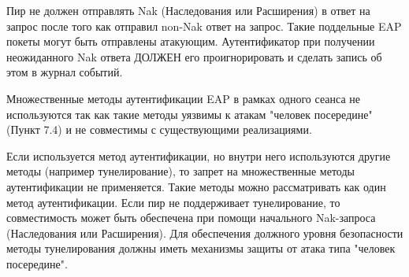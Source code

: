 Пир не должен отправлять Nak (Наследования или Расширения) в ответ на запрос после того как отправил non-Nak ответ на запрос. Такие поддельные EAP покеты могут быть отправлены атакующим. Аутентификатор при получении неожиданного Nak ответа ДОЛЖЕН его проигнорировать и сделать запись об этом в журнал событий.

Множественные методы аутентификации EAP в рамках одного сеанса не используются так как такие методы уязвимы к атакам "человек посередине" (Пункт 7.4) и не совместимы с существующими реализациями.

Если используется метод аутентификации, но внутри него используются другие методы (например тунелирование), то запрет на множественные методы аутентификации не применяется. Такие методы можно рассматривать как один метод аутентификации. Если пир не поддерживает тунелирование, то совместимость может быть обеспечена при помощи начального Nak-запроса (Наследования или Расширения). Для обеспечения должного уровня безопасности методы тунелирования должны иметь механизмы защиты от атака типа "человек посередине".
